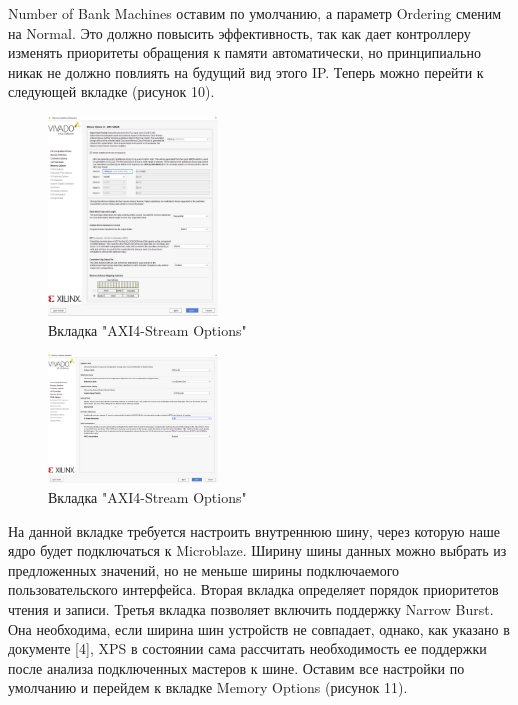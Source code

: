 \documentclass[a4paper,oneside ,14pt]{extreport}
\begin{document}
Number of Bank Machines оставим по умолчанию, а параметр Ordering сменим на Normal. Это должно повысить эффективность, так как дает контроллеру изменять приоритеты обращения к памяти автоматически, но принципиально никак не должно повлиять на будущий вид этого IP. Теперь можно перейти к следующей вкладке (рисунок 10).

\begin{figure}[h]
	\centering
	\includegraphics[width=0.4\textwidth]{image/mig_6.png}
	\caption{Вкладка "AXI4-Stream Options"}
	\label{cordic_axi4_stream_options}
\end{figure}

\begin{figure}[h]
	\centering
	\includegraphics[width=0.4\textwidth]{image/mig_7.png}
	\caption{Вкладка "AXI4-Stream Options"}
	\label{cordic_axi4_stream_options}
\end{figure}

На данной вкладке требуется настроить внутреннюю шину, через которую наше ядро будет подключаться к Microblaze. Ширину шины данных можно выбрать из предложенных значений, но не меньше ширины подключаемого пользовательского интерфейса. Вторая вкладка определяет порядок приоритетов чтения и записи. Третья вкладка позволяет включить поддержку Narrow Burst. Она необходима, если ширина шин устройств не совпадает, однако, как указано в документе [4], XPS в состоянии сама рассчитать необходимость ее поддержки после анализа подключенных мастеров к шине. Оставим все настройки по умолчанию и перейдем к вкладке Memory Options (рисунок 11).
\end{document}
